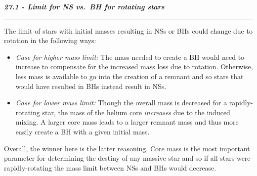 \documentclass[12pt, letterpaper, twoside]{article}
\newcommand{\question}[1]{{\noindent \it #1}}
\newcommand{\answer}[1]{
    \par\noindent\rule{\textwidth}{0.4pt}#1\vspace{0.5cm}
}
\begin{document}
\question{\textbf{27.1 - Limit for NS vs.\ BH for rotating stars}}
\answer{
    The limit of stars with initial masses resulting in NSs or BHs could change due to rotation in the following ways:
    \begin{itemize}
        \item \textit{Case for higher mass limit:} The mass needed to create a BH would need to increase to compensate for the increased mass loss due to rotation. Otherwise, less mass is available to go into the creation of a remnant and so stars that would have resulted in BHs instead result in NSs.
        \item \textit{Case for lower mass limit:} Though the overall mass is decreased for a rapidly-rotating star, the mass of the helium core \textit{increases} due to the induced mixing. A larger core mass leads to a larger remnant mass and thus more easily create a BH with a given initial mass.
    \end{itemize}
    Overall, the winner here is the latter reasoning. Core mass is the most important parameter for determining the destiny of any massive star and so if all stars were rapidly-rotating the mass limit between NSs and BHs would decrease.
}
\end{document}
